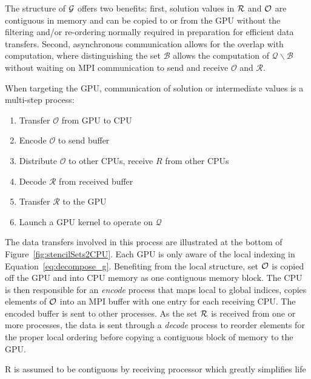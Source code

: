 \documentclass{report}
\begin{document}
 The structure of $\mathcal{G}$ offers two benefits: first, solution values in $\mathcal{R}$ and $\mathcal{O}$ are contiguous in memory and can be copied to or from the GPU without the filtering and/or re-ordering normally required in preparation for efficient data transfers. Second, asynchronous communication allows for the overlap with computation, where distinguishing the set $\mathcal{B}$ allows the computation of $\mathcal{Q}\backslash \mathcal{B}$ without waiting on MPI communication to send and receive $\mathcal{O}$ and $\mathcal{R}$. 

When targeting the GPU, communication of solution or intermediate values is a multi-step process:
   \begin{enumerate}
    \item Transfer $\mathcal{O}$ from GPU to CPU
    \item Encode $\mathcal{O}$ to send buffer
	\item Distribute $\mathcal{O}$ to other CPUs, receive $R$ from other CPUs
	\item Decode $\mathcal{R}$ from received buffer  
	\item Transfer $\mathcal{R}$ to the GPU
	\item Launch a GPU kernel to operate on $\mathcal{Q}$
   \end{enumerate} 
The data transfers involved in this process are illustrated at the bottom of Figure~\ref{fig:stencilSets2CPU}.
    Each GPU is only aware of the local indexing in Equation~\ref{eq:decompose_g}. Benefiting from the local structure, set 
$\mathcal{O}$ is copied off the GPU and into CPU memory as one contiguous memory block. The CPU is then responsible for an \emph{encode} process that maps local to global indices, copies elements of $\mathcal{O}$ into an MPI buffer with one entry for each receiving CPU. The encoded buffer is sent to other processes. As the set $\mathcal{R}$ is received from one or more processes, the data is sent through a \emph{decode} process to reorder elements for the proper local ordering before copying a contiguous block of memory to the GPU. 


R is assumed to be contiguous by receiving processor which greatly simplifies life
\end{document}
